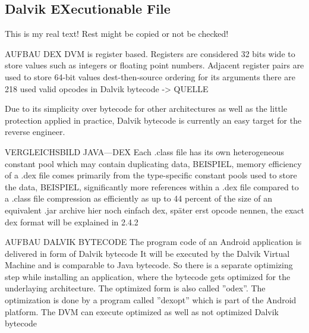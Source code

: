 \subsection{Dalvik EXecutionable File} \label{subsection:android-dalvik}
This is my real text! Rest might be copied or not be checked!

%
AUFBAU DEX
DVM is register based. Registers are considered 32 bits wide to store values such as integers or floating point numbers. Adjacent register pairs are used to store 64-bit values\newline
dest-then-source ordering for its arguments\newline
there are 218 used valid opcodes in Dalvik bytecode -> QUELLE \newline

Due to its simplicity over bytecode for other architectures as well as the little protection applied in practice, Dalvik bytecode is currently an easy target for the reverse engineer.

VERGLEICHSBILD JAVA---DEX\cite{ehringerDalvik}\newline
Each .class file has its own heterogeneous constant pool which may contain duplicating data, BEISPIEL, memory efficiency of a .dex file comes primarily from the type-specific constant pools used to store the data, BEISPIEL,\newline
significantly more references within a .dex file compared to a .class file\cite{ehringerDalvik}\newline
compression as efficiently as up to 44 percent of the size of an equivalent .jar archive\cite{ehringerDalvik}\newline
hier noch einfach dex, später erst opcode nennen, the exact dex format will be explained in 2.4.2\newline

\cite{kovachevaMaster} \cite{ehringerDalvik}
%

AUFBAU DALVIK BYTECODE\newline
The program code of an Android application is delivered in form of Dalvik bytecode\newline
It will be executed by the Dalvik Virtual Machine and is comparable to Java bytecode. So there is a separate
optimizing step while installing an application, where the bytecode gets optimized for the underlaying architecture. The optimized form is also called ”odex”. The optimization is done by a program called ”dexopt” which is part of the Android platform. The DVM can execute optimized as well as not optimized Dalvik bytecode\newline

